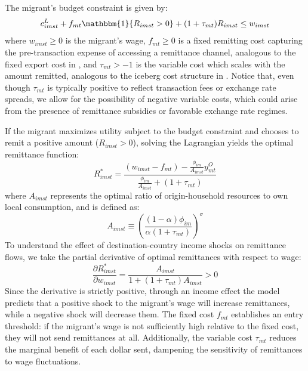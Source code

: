 \par 

The migrant's budget constraint is given by:
\begin{equation}
    c^L_{imst}
    +
    f_{mt}\mathbbm{1}\{R_{imst} > 0\}
    +
    (1 + \tau_{mt})R_{imst}
    \leq
    w_{imst}
\end{equation}
where $w_{imst} \geq 0$ is the migrant's wage, $f_{mt} \geq 0$ is a fixed remitting cost capturing the pre-transaction expense of accessing a remittance channel, analogous to the fixed export cost in \textcite{melitz2003}, and $\tau_{mt} > -1$ is the variable cost which scales with the amount remitted, analogous to the iceberg cost structure in \textcite{melitz2003}. Notice that, even though $\tau_{mt}$ is typically positive to reflect transaction fees or exchange rate spreads, we allow for the possibility of negative variable costs, which could arise from the presence of remittance subsidies or favorable exchange rate regimes.

\par

If the migrant maximizes utility subject to the budget constraint and chooses to remit a positive amount ($R_{imst} > 0$), solving the Lagrangian yields the optimal remittance function:
\begin{equation}
R_{imst}^* = \frac{(w_{imst} - f_{mt}) - \frac{\phi_{im}}{A_{imst}} y^O_{mt}}{\frac{\phi_{im}}{A_{imst}} + (1 + \tau_{mt})}
\end{equation}
where $A_{imst}$ represents the optimal ratio of origin-household resources to own local consumption, and is defined as:
\begin{equation}
    A_{imst}
    \equiv
    \left(
    \frac{(1-\alpha)\phi_{im}}
    {\alpha(1+\tau_{mt})}
    \right)^{\sigma}
\end{equation}
To understand the effect of destination-country income shocks on remittance flows, we take the partial derivative of optimal remittances with respect to wage:
\begin{equation}
    \frac{\partial R^*_{imst}}{\partial w_{imst}}
    =
    \frac{A_{imst}}{1 + (1 + \tau_{mt})A_{imst}}
    >
    0
\end{equation}
Since the derivative is strictly positive, through an income effect the model predicts that a positive shock to the migrant's wage will increase remittances, while a negative shock will decrease them. The fixed cost $f_{mt}$ establishes an entry threshold: if the migrant's wage is not sufficiently high relative to the fixed cost, they will not send remittances at all. Additionally, the variable cost $\tau_{mt}$ reduces the marginal benefit of each dollar sent, dampening the sensitivity of remittances to wage fluctuations.

